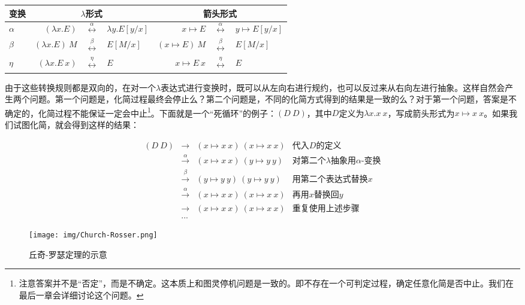 \documentclass[UTF8]{article}
\begin{document}
\vspace{5mm}
\begin{tabular}{|l|rcl|rcl|}
\hline
变换 & \multicolumn{3}{|c|}{$\lambda$形式} & \multicolumn{3}{|c|}{箭头形式} \\
\hline
$\alpha$ & $(\lambda x . E)$ & $\overset{\alpha}{\longleftrightarrow}$ & $\lambda y . E[y/x]$
         & $x \mapsto E$ & $\overset{\alpha}{\longleftrightarrow}$ & $y \mapsto E[y/x]$ \\
\hline
$\beta$  & $(\lambda x . E)\ M$ & $\overset{\beta}{\longleftrightarrow}$ & $E[M/x]$
         & $(x \mapsto E)\ M$ & $\overset{\beta}{\longleftrightarrow}$ & $E[M/x]$ \\
\hline
$\eta$   & $(\lambda x . E\ x)$ & $\overset{\eta}{\longleftrightarrow}$ & $E$
         & $x \mapsto E\ x$ & $\overset{\eta}{\longleftrightarrow}$ & $E$ \\
\hline
\end{tabular}
\vspace{5mm}

由于这些转换规则都是双向的，在对一个$\lambda$表达式进行变换时，既可以从左向右进行规约，也可以反过来从右向左进行抽象。这样自然会产生两个问题。第一个问题是，化简过程最终会停止么？第二个问题是，不同的化简方式得到的结果是一致的么？对于第一个问题，答案是不确定的，化简过程不能保证一定会中止\footnote{注意答案并不是“否定”，而是不确定。这本质上和图灵停机问题是一致的。即不存在一个可判定过程，确定任意化简是否中止。我们在最后一章会详细讨论这个问题。}。下面就是一个“死循环”的例子：$(D\ D)$，其中$D$定义为$\lambda x. x\ x$，写成箭头形式为$x \mapsto x\ x$。如果我们试图化简，就会得到这样的结果：

\[
\begin{array}{rcll}
(D\ D) & \to & (x \mapsto x\ x)\ (x \mapsto x\ x) & \text{代入$D$的定义} \\
       & \xrightarrow{\alpha} & (x \mapsto x\ x)\ (y \mapsto y\ y) & \text{对第二个$\lambda$抽象用$\alpha$-变换} \\
       & \xrightarrow{\beta} & (y \mapsto y\ y)\ (y \mapsto y\ y) & \text{用第二个表达式替换$x$} \\
       & \xrightarrow{\alpha} & (x \mapsto x\ x)\ (x \mapsto x\ x) & \text{再用$x$替换回$y$} \\
       & \to & (x \mapsto x\ x)\ (x \mapsto x\ x) & \text{重复使用上述步骤} \\
       & ... &
\end{array}
\]

\begin{wrapfigure}{R}{0.3\textwidth}
 \centering
 \texttt{[image: img/Church-Rosser.png]}
 \caption{丘奇-罗瑟定理的示意}
 \label{fig:Church-Rosser-confluence}
\end{wrapfigure}
\end{document}
